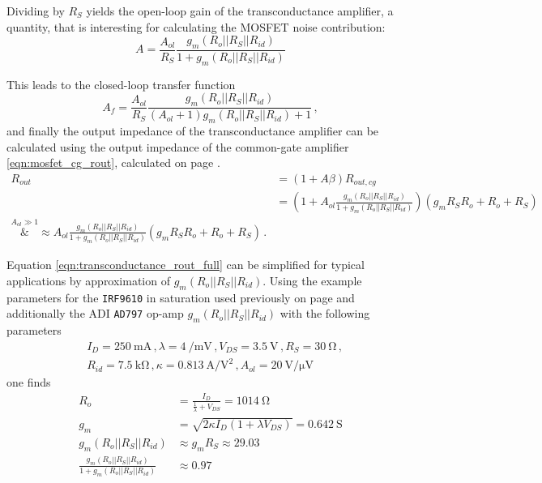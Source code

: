 \documentclass[12pt]{book}
\providecommand{\device}[1]{\texttt{\small #1}}
\begin{document}
Dividing by $R_S$ yields the open-loop gain of the transconductance amplifier, a quantity, that is interesting for calculating the MOSFET noise contribution:
\begin{equation}
    A = \frac{A_{ol}}{R_S} \frac{g_m \left(R_o || R_S || R_{id}\right)}{1 + g_m \left(R_o || R_S || R_{id}\right)} \label{eqn:transconductance_amplifier_open_loop_gain}
\end{equation}

This leads to the closed-loop transfer function
\begin{equation}
    A_f = \frac{A_{ol}}{R_S} \frac{g_m \left(R_o || R_S || R_{id}\right)}{(A_{ol}+1)g_m \left(R_o || R_S || R_{id}\right) + 1} \label{eqn:transconductance_amplifier_transfer_function} \,,
\end{equation}
and finally the output impedance of the transconductance amplifier can be calculated using the output impedance of the common-gate amplifier \ref{eqn:mosfet_cg_rout}, calculated on page \pageref{eqn:mosfet_cg_rout}.
\begin{align}
    R_{out} &= \left(1+ A\beta\right) R_{out,cg} \nonumber\\
    &= \left(1 + A_{ol} \frac{g_m \left(R_o || R_S || R_{id}\right)}{1 + g_m \left(R_o || R_S || R_{id}\right)} \right) \left(g_m R_S R_o + R_o + R_S \right) \nonumber\\
    \overset{A_{ol} \gg 1}&{\approx} A_{ol} \frac{g_m \left(R_o || R_S || R_{id}\right)}{1 + g_m \left(R_o || R_S || R_{id}\right)} \left(g_m R_S R_o + R_o + R_S \right) \,. \label{eqn:transconductance_rout_full}
\end{align}

Equation \ref{eqn:transconductance_rout_full} can be simplified for typical applications by approximation of $g_m \left(R_o || R_S || R_{id}\right)$. Using the example parameters for the \device{IRF9610} in saturation used previously on page \pageref{eqn:mosfet_rout_irf9610} and additionally the ADI \device{AD797} \cite{datasheet_AD797} op-amp $g_m \left(R_o || R_S || R_{id}\right)$ with the following parameters
\begin{align}
    &I_D = \qty{250}{\mA} \,, \lambda = \qty[per-mode=power]{4}{\per \milli \volt} \,, V_{DS} = \qty{3.5}{\V}\,, R_S = \qty{30}{\ohm}\,, \nonumber\\
    &R_{id} = \qty{7.5}{\kilo\ohm}\,, \kappa = \qty[per-mode=power]{0.813}{\ampere \per \square\volt}\,, A_{ol} = \qty[per-mode=power]{20}{\volt \per \uV} \nonumber
\end{align}
one finds
\begin{align}
    R_{o} &= \frac{I_D}{\frac{1}{\lambda} + V_{DS}} = \qty{1014}{\ohm} \nonumber\\
    g_m &= \sqrt{2 \kappa I_D \left(1+ \lambda V_{DS}\right)} = \qty{0.642}{\siemens} \nonumber\\
    g_m \left(R_o || R_S || R_{id}\right) &\approx g_m R_S \approx \num{29.03}\nonumber\\
    \frac{g_m \left(R_o || R_S || R_{id}\right)}{1 + g_m \left(R_o || R_S || R_{id}\right)} &\approx \num{0.97} \nonumber
\end{align}
\end{document}
